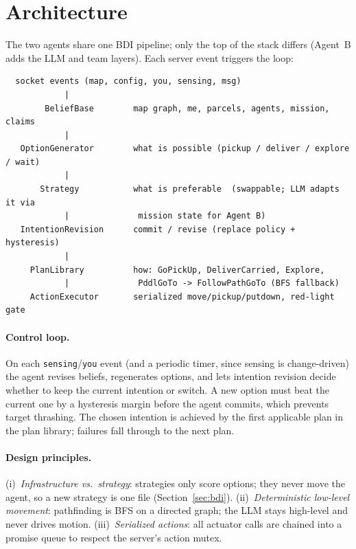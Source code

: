 \section{Architecture}
\label{sec:arch}

The two agents share one BDI pipeline; only the top of the stack differs
(Agent~B adds the LLM and team layers). Each server event triggers the loop:

\begin{verbatim}
  socket events (map, config, you, sensing, msg)
            |
        BeliefBase        map graph, me, parcels, agents, mission, claims
            |
   OptionGenerator        what is possible (pickup / deliver / explore / wait)
            |
       Strategy           what is preferable  (swappable; LLM adapts it via
            |              mission state for Agent B)
   IntentionRevision      commit / revise (replace policy + hysteresis)
            |
     PlanLibrary          how: GoPickUp, DeliverCarried, Explore,
            |              PddlGoTo -> FollowPathGoTo (BFS fallback)
     ActionExecutor       serialized move/pickup/putdown, red-light gate
\end{verbatim}

\paragraph{Control loop.} On each \texttt{sensing}/\texttt{you} event (and a
periodic timer, since sensing is change-driven) the agent revises beliefs,
regenerates options, and lets intention revision decide whether to keep the
current intention or switch. A new option must beat the current one by a
hysteresis margin before the agent commits, which prevents target thrashing.
The chosen intention is achieved by the first applicable plan in the plan
library; failures fall through to the next plan.

\paragraph{Design principles.} (i)~\emph{Infrastructure vs.\ strategy}:
strategies only score options; they never move the agent, so a new strategy is
one file (Section~\ref{sec:bdi}). (ii)~\emph{Deterministic low-level
movement}: pathfinding is BFS on a directed graph; the LLM stays high-level and
never drives motion. (iii)~\emph{Serialized actions}: all actuator calls are
chained into a promise queue to respect the server's action mutex.

